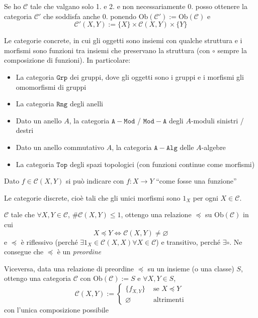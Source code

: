 \begin{remark}{}
    Se ho \(\mathcal{C}\) tale che valgano solo 1. e 2. e non necessariamente 0. posso
    ottenere la categoria \(\mathcal{C}'\) che soddisfa anche 0. ponendo \(\mathrm{Ob}{(\mathcal{C}')} := \mathrm{Ob}{(\mathcal{C})}\) e 
    \[
      \mathcal{C}'{(X, Y)} := \{X\} \times \mathcal{C}{(X,Y)} \times \{Y\} 
    \]
\end{remark}
\begin{example}{}
    Le categorie concrete, in cui gli oggetti sono insiemi con qualche struttura
    e i morfismi sono funzioni tra insiemi che preservano la struttura (con \(\circ\) sempre la composizione di funzioni). In particolare:
\begin{itemize}
    \item La categoria \(\mathtt{Grp}\) dei gruppi, dove gli oggetti sono i
        gruppi e i morfismi gli omomorfismi di gruppi
    \item La categoria \(\mathtt{Rng}\) degli anelli
    \item Dato un anello \(A\), la categoria \(\mathtt{A-Mod}\) / \(\mathtt{Mod-A}\) degli \(A\)-moduli sinistri / destri
    \item Dato un anello commutativo \(A\), la categoria \(\mathtt{A-Alg}\)
        delle \(A\)-algebre
    \item La categoria \(\mathtt{Top}\) degli spazi topologici (con funzioni
        continue come morfismi)
\end{itemize}
\end{example}
\begin{note}{}
    Dato \(f \in \mathcal{C}{(X, Y)}\) si può indicare con \(f : X \to Y\) ``come fosse
    una funzione''
\end{note}

\begin{example}{}
    Le categorie discrete, cioè tali che gli unici morfismi sono \(1_X\) per
    ogni \(X \in \mathcal{C}\).
\end{example}

\begin{example}{}
    \(\mathcal{C}\) tale che \(\forall X, Y \in \mathcal{C}\), \(\# \mathcal{C} {(X, Y)} \le 1\), ottengo
    una relazione \(\preccurlyeq \) su \(\mathrm{Ob}{(\mathcal{C})}\) in cui
    \[
      X \preccurlyeq Y \iff \mathcal{C}{(X, Y)} \neq \varnothing
    \]
    e \(\preccurlyeq\)  è riflessivo (perché \(\exists  1_X \in \mathcal{C}{(X, X)} \forall X \in \mathcal{C}\)) e transitivo, perché \(\exists \circ\). Ne consegue che \(\preccurlyeq\) è un \emph{preordine}

    Viceversa, data una relazione di preordine \(\preccurlyeq\) su un insieme (o
    una classe) \(S\), ottengo una categoria \(\mathcal{C}\) con \(\mathrm{Ob}{(\mathcal{C})} := S\) e \(\forall X, Y \in S\), 
    \[
      \mathcal{C}{(X, Y)} := \begin{cases}{}
          \{f_{X,Y} \} & \text{ se } X \preccurlyeq Y \\
          \varnothing & \text{ altrimenti}
      \end{cases}
    \]
    con l'unica composizione possibile
\end{example}


